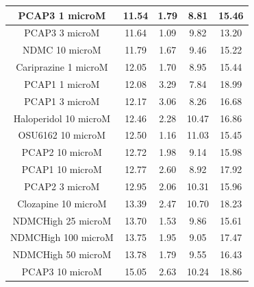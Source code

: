 \documentclass[a4paper,12pt]{article}
\begin{document}
\begin{table}[h!]
\begin{tabular}{|c|c|c|c|c|}
PCAP3 1 microM       & 11.54 & 1.79 & 8.81  & 15.46 \\ \hline
PCAP3 3 microM       & 11.64 & 1.09 & 9.82  & 13.20  \\ \hline
NDMC 10 microM         & 11.79 & 1.67 & 9.46  & 15.22 \\ \hline
Cariprazine 1 microM   & 12.05 & 1.70  & 8.95  & 15.44 \\ \hline
PCAP1 1 microM         & 12.08 & 3.29 & 7.84  & 18.99 \\ \hline
PCAP1 3 microM         & 12.17 & 3.06 & 8.26  & 16.68 \\ \hline
Haloperidol 10 microM  & 12.46 & 2.28 & 10.47 & 16.86 \\ \hline
OSU6162 10 microM      & 12.50  & 1.16 & 11.03 & 15.45 \\ \hline
PCAP2 10 microM        & 12.72 & 1.98 & 9.14  & 15.98 \\ \hline
PCAP1 10 microM        & 12.77 & 2.60  & 8.92  & 17.92 \\ \hline
PCAP2 3 microM         & 12.95 & 2.06 & 10.31 & 15.96 \\ \hline
Clozapine 10 microM    & 13.39 & 2.47 & 10.70  & 18.23 \\ \hline
NDMCHigh 25 microM     & 13.70  & 1.53 & 9.86  & 15.61 \\ \hline
NDMCHigh 100 microM    & 13.75 & 1.95 & 9.05  & 17.47 \\ \hline
NDMCHigh 50 microM     & 13.78 & 1.79 & 9.55  & 16.43 \\ \hline
PCAP3 10 microM      & 15.05 & 2.63 & 10.24 & 18.86 \\\hline
\end{tabular} 
\end{table}
\newpage
\end{document}
